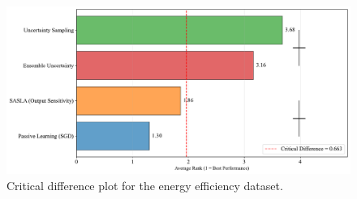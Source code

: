 \documentclass[10pt, conference]{IEEEtran}
\begin{document}
\begin{figure}[!t]
	\centering
	\includegraphics[width=\linewidth]{../results/energy/critical_difference_plot.pdf}
	\caption{Critical difference plot for the energy efficiency dataset.}
	\label{fig:cd_energy}
\end{figure}
\end{document}
